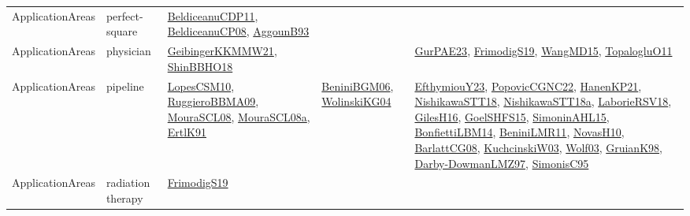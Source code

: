 {\begin{longtable}{lp{3cm}>{\raggedright}p{6cm}>{\raggedright}p{6cm}p{8cm}}
ApplicationAreas & perfect-square & \href{articles/BeldiceanuCDP11.pdf}{BeldiceanuCDP11}\cite{BeldiceanuCDP11}, \href{papers/BeldiceanuCP08.pdf}{BeldiceanuCP08}\cite{BeldiceanuCP08}, \href{articles/AggounB93.pdf}{AggounB93}\cite{AggounB93} &  & \\
ApplicationAreas & physician & \href{papers/GeibingerKKMMW21.pdf}{GeibingerKKMMW21}\cite{GeibingerKKMMW21}, \href{articles/ShinBBHO18.pdf}{ShinBBHO18}\cite{ShinBBHO18} &  & \href{articles/GurPAE23.pdf}{GurPAE23}\cite{GurPAE23}, \href{papers/FrimodigS19.pdf}{FrimodigS19}\cite{FrimodigS19}, \href{articles/WangMD15.pdf}{WangMD15}\cite{WangMD15}, \href{articles/TopalogluO11.pdf}{TopalogluO11}\cite{TopalogluO11}\\
ApplicationAreas & pipeline & \href{articles/LopesCSM10.pdf}{LopesCSM10}\cite{LopesCSM10}, \href{articles/RuggieroBBMA09.pdf}{RuggieroBBMA09}\cite{RuggieroBBMA09}, \href{papers/MouraSCL08.pdf}{MouraSCL08}\cite{MouraSCL08}, \href{papers/MouraSCL08a.pdf}{MouraSCL08a}\cite{MouraSCL08a}, \href{papers/ErtlK91.pdf}{ErtlK91}\cite{ErtlK91} & \href{papers/BeniniBGM06.pdf}{BeniniBGM06}\cite{BeniniBGM06}, \href{papers/WolinskiKG04.pdf}{WolinskiKG04}\cite{WolinskiKG04} & \href{papers/EfthymiouY23.pdf}{EfthymiouY23}\cite{EfthymiouY23}, \href{papers/PopovicCGNC22.pdf}{PopovicCGNC22}\cite{PopovicCGNC22}, \href{papers/HanenKP21.pdf}{HanenKP21}\cite{HanenKP21}, \href{papers/NishikawaSTT18.pdf}{NishikawaSTT18}\cite{NishikawaSTT18}, \href{papers/NishikawaSTT18a.pdf}{NishikawaSTT18a}\cite{NishikawaSTT18a}, \href{articles/LaborieRSV18.pdf}{LaborieRSV18}\cite{LaborieRSV18}, \href{papers/GilesH16.pdf}{GilesH16}\cite{GilesH16}, \href{articles/GoelSHFS15.pdf}{GoelSHFS15}\cite{GoelSHFS15}, \href{articles/SimoninAHL15.pdf}{SimoninAHL15}\cite{SimoninAHL15}, \href{articles/BonfiettiLBM14.pdf}{BonfiettiLBM14}\cite{BonfiettiLBM14}, \href{articles/BeniniLMR11.pdf}{BeniniLMR11}\cite{BeniniLMR11}, \href{articles/NovasH10.pdf}{NovasH10}\cite{NovasH10}, \href{papers/BarlattCG08.pdf}{BarlattCG08}\cite{BarlattCG08}, \href{articles/KuchcinskiW03.pdf}{KuchcinskiW03}\cite{KuchcinskiW03}, \href{papers/Wolf03.pdf}{Wolf03}\cite{Wolf03}, \href{papers/GruianK98.pdf}{GruianK98}\cite{GruianK98}, \href{articles/Darby-DowmanLMZ97.pdf}{Darby-DowmanLMZ97}\cite{Darby-DowmanLMZ97}, \href{papers/SimonisC95.pdf}{SimonisC95}\cite{SimonisC95}\\
ApplicationAreas & radiation therapy & \href{papers/FrimodigS19.pdf}{FrimodigS19}\cite{FrimodigS19} &  & \\

\end{longtable}}
